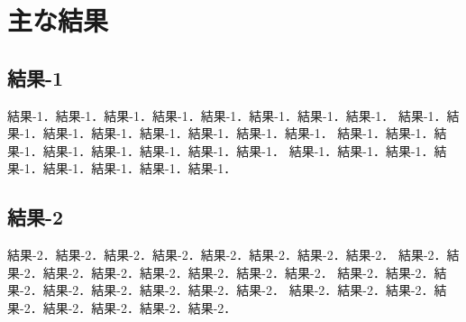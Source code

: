 \chapter{主な結果}

\section{結果-1}

結果-1．結果-1．結果-1．結果-1．結果-1．結果-1．結果-1．結果-1．
結果-1．結果-1．結果-1．結果-1．結果-1．結果-1．結果-1．結果-1．
結果-1．結果-1．結果-1．結果-1．結果-1．結果-1．結果-1．結果-1．
結果-1．結果-1．結果-1．結果-1．結果-1．結果-1．結果-1．結果-1．


\section{結果-2}

結果-2．結果-2．結果-2．結果-2．結果-2．結果-2．結果-2．結果-2．
結果-2．結果-2．結果-2．結果-2．結果-2．結果-2．結果-2．結果-2．
結果-2．結果-2．結果-2．結果-2．結果-2．結果-2．結果-2．結果-2．
結果-2．結果-2．結果-2．結果-2．結果-2．結果-2．結果-2．結果-2．
